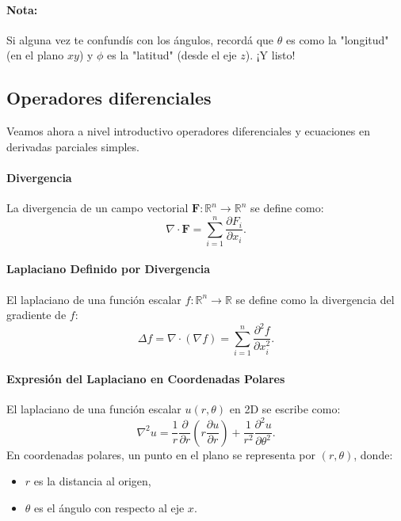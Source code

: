 \documentclass[11pt]{book}
\theoremstyle{definicion}
\theoremstyle{teorema}
\theoremstyle{ejemplo}
\begin{document}
\paragraph{Nota:}
Si alguna vez te confundís con los ángulos, recordá que \(\theta\) es como la "longitud" (en el plano \(xy\)) y \(\phi\) es la "latitud" (desde el eje \(z\)). ¡Y listo! 

\subsection{Operadores diferenciales}

\noindent Veamos ahora a nivel introductivo operadores diferenciales y ecuaciones en derivadas parciales simples.

\paragraph{Divergencia}
La divergencia de un campo vectorial \( \mathbf{F}: \mathbb{R}^n \to \mathbb{R}^n \) se define como:
\[ \nabla \cdot \mathbf{F} = \sum_{i=1}^n \frac{\partial F_i}{\partial x_i}. \]

\paragraph{Laplaciano Definido por Divergencia}
El laplaciano de una función escalar \( f: \mathbb{R}^n \to \mathbb{R} \) se define como la divergencia del gradiente de \( f \):
\[ \Delta f = \nabla \cdot (\nabla f) = \sum_{i=1}^n \frac{\partial^2 f}{\partial x_i^2}. \]

\paragraph{Expresión del Laplaciano en Coordenadas Polares}

El laplaciano de una función escalar \( u(r, \theta) \) en 2D se escribe como:
\[
\nabla^2 u = \frac{1}{r} \frac{\partial}{\partial r}\left(r \frac{\partial u}{\partial r}\right) + \frac{1}{r^2} \frac{\partial^2 u}{\partial \theta^2}.
\]
%
En coordenadas polares, un punto en el plano se representa por \((r, \theta)\), donde:
\begin{itemize}
    \item \( r \) es la distancia al origen,
    \item \( \theta \) es el ángulo con respecto al eje \( x \).
\end{itemize}
\end{document}
